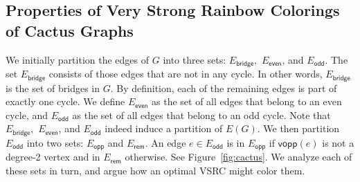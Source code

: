 \documentclass[letter,runningheads,envcountsame,envcountsect]{llncs}
\newcommand{\cvsrc}{VSRC}
\newcommand{\et}{E_{\mathsf{bridge}}}
\newcommand{\eeven}{E_{\mathsf{even}}}
\newcommand{\eodd}{E_{\mathsf{odd}}}
\newcommand{\eopp}{E_{\mathsf{opp}}}
\newcommand{\erem}{E_{\mathsf{rem}}}
\newcommand{\vopp}{\mathsf{vopp}}
\newcommand{\os}{\mathsf{OS}}
\begin{document}


\subsection{Properties of Very Strong Rainbow Colorings of Cactus Graphs}
We initially partition the edges of $G$ into three sets: $\et,$ $\eeven$, and $\eodd$.
The set $\et$ consists of those edges that are not in any cycle.
In other words, $\et$ is the set of bridges in $G$.
By definition, each of the remaining edges is part of exactly one cycle. 
We define $\eeven$ as the set of all edges that belong to an even cycle, and
$\eodd$ as the set of all edges that belong to an odd cycle. Note that $\et,$ $\eeven$, and $\eodd$ indeed induce a partition of $E(G)$.
We then partition $\eodd$ into two sets: $\eopp$ and $\erem$. An edge $e\in \eodd$ is in $\eopp$ if $\vopp(e)$ is not a degree-2 vertex and in $\erem$ otherwise. See Figure~\ref{fig:cactus}. We analyze each of these sets in turn, and argue how an optimal {\cvsrc} might color them. 
\end{document}
